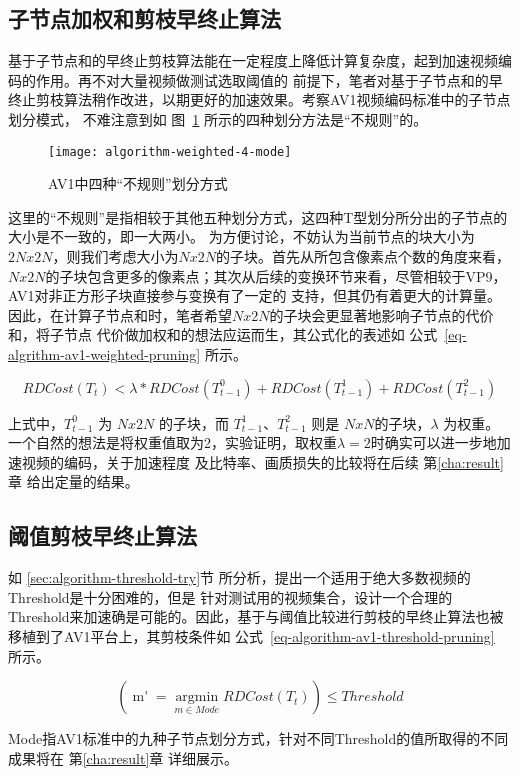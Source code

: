 \subsection{子节点加权和剪枝早终止算法}

基于子节点和的早终止剪枝算法能在一定程度上降低计算复杂度，起到加速视频编码的作用。再不对大量视频做测试选取阈值的
前提下，笔者对基于子节点和的早终止剪枝算法稍作改进，以期更好的加速效果。考察AV1视频编码标准中的子节点划分模式，
不难注意到如 图~\ref{fig:algorithm-weighted-4-mode} 所示的四种划分方法是“不规则”的。

\begin{figure}[H] %
  \centering
  \texttt{[image: algorithm-weighted-4-mode]}
  \caption{AV1中四种“不规则”划分方式}
  \label{fig:algorithm-weighted-4-mode}
\end{figure}

这里的“不规则”是指相较于其他五种划分方式，这四种T型划分所分出的子节点的大小是不一致的，即一大两小。
为方便讨论，不妨认为当前节点的块大小为$2Nx2N$，则我们考虑大小为$Nx2N$的子块。首先从所包含像素点个数的角度来看，
$Nx2N$的子块包含更多的像素点；其次从后续的变换环节来看，尽管相较于VP9，AV1对非正方形子块直接参与变换有了一定的
支持，但其仍有着更大的计算量。因此，在计算子节点和时，笔者希望$Nx2N$的子块会更显著地影响子节点的代价和，将子节点
代价做加权和的想法应运而生，其公式化的表述如 公式~\ref{eq-algrithm-av1-weighted-pruning} 所示。

\begin{equation}
\label{eq-algrithm-av1-weighted-pruning}
RDCost(T_t) < \lambda * RDCost(T^0_{t-1}) + RDCost(T^1_{t-1}) + RDCost(T^2_{t-1})
\end{equation}

上式中，$T^0_{t-1}$ 为 $Nx2N$ 的子块，而 $T^1_{t-1}$、$T^2_{t-1}$ 则是 $NxN$的子块，$\lambda$ 为权重。
一个自然的想法是将权重值取为2，实验证明，取权重$\lambda = 2$时确实可以进一步地加速视频的编码，关于加速程度
及比特率、画质损失的比较将在后续 第\ref{cha:result}章 给出定量的结果。

\subsection{阈值剪枝早终止算法}

如 \ref{sec:algorithm-threshold-try}节 所分析，提出一个适用于绝大多数视频的Threshold是十分困难的，但是
针对测试用的视频集合，设计一个合理的Threshold来加速确是可能的。因此，基于与阈值比较进行剪枝的早终止算法也被
移植到了AV1平台上，其剪枝条件如 公式~\ref{eq-algorithm-av1-threshold-pruning} 所示。

\begin{equation}
\label{eq-algorithm-av1-threshold-pruning}
(\mathop{m'} =  \mathop{argmin}\limits_{m \in Mode} RDCost(T_t)) \le Threshold 
\end{equation}

Mode指AV1标准中的九种子节点划分方式，针对不同Threshold的值所取得的不同成果将在 第\ref{cha:result}章 详细展示。